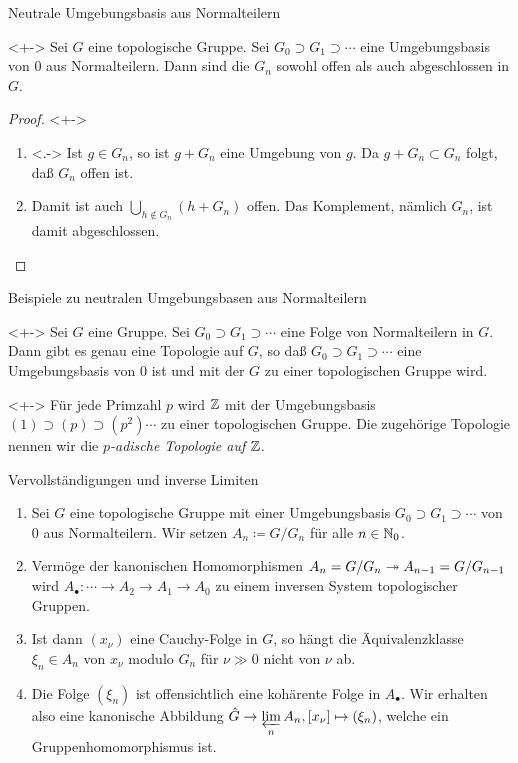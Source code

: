 \begin{frame}{Neutrale Umgebungsbasis aus Normalteilern}
	\begin{proposition}<+->
		Sei \(G\) eine topologische Gruppe. Sei \(G_0 \supset G_1 \supset \dotsb\)
		eine Umgebungsbasis von \(0\) aus Normalteilern. Dann sind die \(G_n\) sowohl offen als auch
		abgeschlossen in \(G\).
	\end{proposition}
	\begin{proof}<+->
		\begin{enumerate}[<+->]
		\item<.->
			Ist \(g \in G_n\), so ist \(g + G_n\) eine Umgebung von \(g\). Da \(g + G_n \subset G_n\)
			folgt, daß \(G_n\) offen ist.
		\item
			Damit ist auch \(\bigcup\limits_{h \notin G_n} (h + G_n)\) offen. Das Komplement, nämlich 
			\(G_n\), ist damit abgeschlossen.
			\qedhere
		\end{enumerate}
	\end{proof}
\end{frame}

\begin{frame}{Beispiele zu neutralen Umgebungsbasen aus Normalteilern}
	\begin{example}<+->
		Sei \(G\) eine  Gruppe. Sei \(G_0 \supset G_1 \supset \dotsb\) eine
		Folge von Normalteilern in \(G\). Dann gibt es genau eine Topologie
		auf \(G\), so daß \(G_0 \supset G_1 \supset \dotsb\) eine Umgebungsbasis
		von \(0\) ist und mit der \(G\) zu einer topologischen Gruppe wird.
	\end{example}
	\begin{example}<+->
		Für jede Primzahl \(p\) wird
		\(\mathbb Z\) mit der Umgebungsbasis \((1) \supset (p) \supset (p^2) \dotsb\)
		zu einer topologischen Gruppe. Die zugehörige Topologie nennen wir
		die \emph{\(p\)-adische Topologie auf \(\mathbb Z\)}.
	\end{example}
\end{frame}

\begin{frame}{Vervollständigungen und inverse Limiten}
	\begin{enumerate}[<+->]
	\item
		Sei \(G\) eine topologische Gruppe mit einer Umgebungsbasis \(G_0 \supset G_1 \supset \dotsb\)
		von \(0\) aus Normalteilern. Wir setzen \(A_n \coloneqq G/G_n\) für alle \(n \in \mathbb N_0\).
	\item
		Vermöge der kanonischen Homomorphismen \(A_n = G/G_n \twoheadrightarrow A_{n - 1} = G/G_{n - 1}\) wird
		\(A_\bullet\colon \dotsb \to A_2 \to A_1 \to A_0\) zu einem inversen System topologischer Gruppen.
	\item
		Ist dann \((x_{\nu})\) eine Cauchy-Folge in \(G\), so hängt die Äquivalenzklasse \(\xi_n \in A_n\) von
		\(x_{\nu}\) modulo \(G_n\) für \(\nu \gg 0\) nicht von \(\nu\) ab.
	\item
		Die Folge \((\xi_n)\) ist offensichtlich eine kohärente Folge in \(A_\bullet\). Wir erhalten also
		eine kanonische Abbildung \(\hat G \to \varprojlim\limits_n A_n, [x_\nu] \mapsto (\xi_n)\),
		welche ein Gruppenhomomorphismus ist.
	\end{enumerate}
\end{frame}

